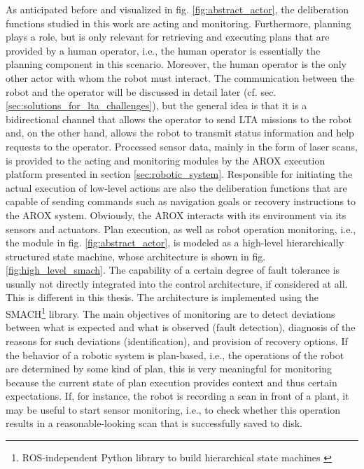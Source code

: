 \documentclass[english, master, utf8]{base/thesis_KBS}
\newcommand{\code}{\collectverb{\codebox}}
\begin{document}
\noindent
As anticipated before and visualized in fig. \ref{fig:abstract_actor}, the deliberation functions studied in this work are acting and monitoring. Furthermore, planning plays a role,
but is only relevant for retrieving and executing plans that are provided by a human operator, i.e., the human operator is essentially the planning component in this scenario.
Moreover, the human operator is the only other actor with whom the robot must interact. The communication between the robot and the operator will be discussed in detail later (cf. sec.
\ref{sec:solutions_for_lta_challenges}), but the general idea is that it is a bidirectional channel that allows the operator to send LTA missions to the robot and, on the
other hand, allows the robot to transmit status information and help requests to the operator. Processed sensor data, mainly in the form of laser scans, is provided to the
acting and monitoring modules by the AROX execution platform presented in section \ref{sec:robotic_system}. Responsible for initiating the actual execution of low-level actions
are also the deliberation functions that are capable of sending commands such as \code{move_base_flex} navigation goals or recovery instructions to the AROX system.
Obviously, the AROX interacts with its environment via its sensors and actuators.\newline
Plan execution, as well as robot operation monitoring, i.e., the  module in fig. \ref{fig:abstract_actor}, is modeled as a high-level hierarchically
structured state machine, whose architecture is shown in fig. \ref{fig:high_level_smach}. The capability of a certain degree of fault tolerance is usually not directly integrated
into the control architecture, if considered at all. \cite{Khalastchi:2018} This is different in this thesis.
The architecture is implemented using the SMACH\footnote{ROS-independent Python
library to build hierarchical state machines \cite{smach}} library. The main objectives of monitoring are to detect deviations between what is expected and what is observed
(fault detection), diagnosis of the reasons for such deviations (identification), and provision of recovery options. \cite{Ingrand:2017}
If the behavior of a robotic system is plan-based, i.e., the operations of the robot are determined by some kind of plan, this is very meaningful for monitoring because the current
state of plan execution provides context and thus certain expectations. \cite{Khalastchi:2018} If, for instance, the robot is recording a scan in front of a plant, it may be useful
to start sensor monitoring, i.e., to check whether this operation results in a reasonable-looking scan that is successfully saved to disk.
\end{document}
